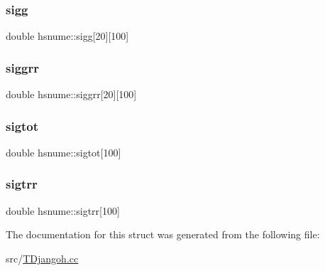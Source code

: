 \mbox{\label{structhsnume_a2ba6a7dcef66b03f51326be9d34d929d}} 
\subsubsection{\texorpdfstring{sigg}{sigg}}
{\footnotesize\ttfamily double hsnume\+::sigg\mbox{[}20\mbox{]}\mbox{[}100\mbox{]}}

\mbox{\label{structhsnume_af0f418356c58dc2308acf139113abe6b}} 
\subsubsection{\texorpdfstring{siggrr}{siggrr}}
{\footnotesize\ttfamily double hsnume\+::siggrr\mbox{[}20\mbox{]}\mbox{[}100\mbox{]}}

\mbox{\label{structhsnume_ad83b273fb9a02cf1faf3031d209e0ce1}} 
\subsubsection{\texorpdfstring{sigtot}{sigtot}}
{\footnotesize\ttfamily double hsnume\+::sigtot\mbox{[}100\mbox{]}}

\mbox{\label{structhsnume_a76bc97de817d06e5b6ee2f0bc37ad7dd}} 
\subsubsection{\texorpdfstring{sigtrr}{sigtrr}}
{\footnotesize\ttfamily double hsnume\+::sigtrr\mbox{[}100\mbox{]}}



The documentation for this struct was generated from the following file\+:\begin{DoxyCompactItemize}
\item 
src/\hyperlink{_t_djangoh_8cc}{T\+Djangoh.\+cc}\end{DoxyCompactItemize}
